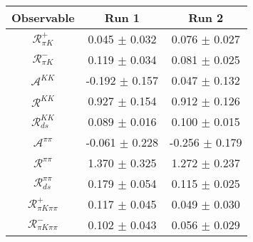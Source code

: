 \begin{tabular}{ccc}
Observable & Run 1 & Run 2 \\
\midrule
$\mathcal{R}_{\pi K}^+$ & 0.045 $\pm$ 0.032 & 0.076 $\pm$ 0.027 \\
$\mathcal{R}_{\pi K}^-$ & 0.119 $\pm$ 0.034 & 0.081 $\pm$ 0.025 \\
$\mathcal{A}^{KK}$ & -0.192 $\pm$ 0.157 & 0.047 $\pm$ 0.132 \\
$\mathcal{R}^{KK}$ & 0.927 $\pm$ 0.154 & 0.912 $\pm$ 0.126 \\
$\mathcal{R}_{ds}^{KK}$ & 0.089 $\pm$ 0.016 & 0.100 $\pm$ 0.015 \\
$\mathcal{A}^{\pi\pi}$ & -0.061 $\pm$ 0.228 & -0.256 $\pm$ 0.179 \\
$\mathcal{R}^{\pi\pi}$ & 1.370 $\pm$ 0.325 & 1.272 $\pm$ 0.237 \\
$\mathcal{R}_{ds}^{\pi\pi}$ & 0.179 $\pm$ 0.054 & 0.115 $\pm$ 0.025 \\
$\mathcal{R}_{\pi K\pi\pi}^+$ & 0.117 $\pm$ 0.045 & 0.049 $\pm$ 0.030 \\
$\mathcal{R}_{\pi K\pi\pi}^-$ & 0.102 $\pm$ 0.043 & 0.056 $\pm$ 0.029 \\
\end{tabular}

